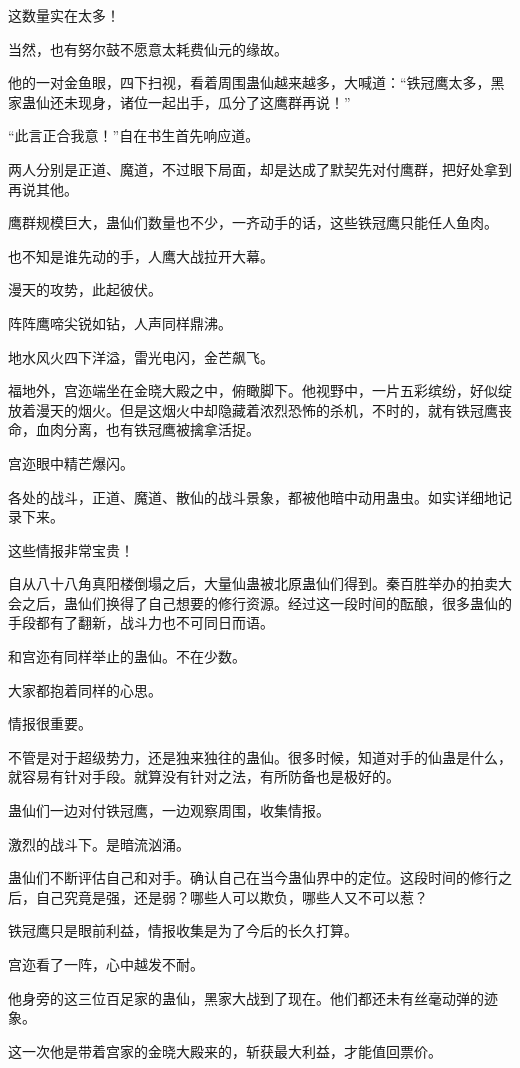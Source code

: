 \begin{this_body}
这数量实在太多！

当然，也有努尔鼓不愿意太耗费仙元的缘故。

他的一对金鱼眼，四下扫视，看着周围蛊仙越来越多，大喊道：“铁冠鹰太多，黑家蛊仙还未现身，诸位一起出手，瓜分了这鹰群再说！”

“此言正合我意！”自在书生首先响应道。

两人分别是正道、魔道，不过眼下局面，却是达成了默契先对付鹰群，把好处拿到再说其他。

鹰群规模巨大，蛊仙们数量也不少，一齐动手的话，这些铁冠鹰只能任人鱼肉。

也不知是谁先动的手，人鹰大战拉开大幕。

漫天的攻势，此起彼伏。

阵阵鹰啼尖锐如钻，人声同样鼎沸。

地水风火四下洋溢，雷光电闪，金芒飙飞。

福地外，宫迩端坐在金晓大殿之中，俯瞰脚下。他视野中，一片五彩缤纷，好似绽放着漫天的烟火。但是这烟火中却隐藏着浓烈恐怖的杀机，不时的，就有铁冠鹰丧命，血肉分离，也有铁冠鹰被擒拿活捉。

宫迩眼中精芒爆闪。

各处的战斗，正道、魔道、散仙的战斗景象，都被他暗中动用蛊虫。如实详细地记录下来。

这些情报非常宝贵！

自从八十八角真阳楼倒塌之后，大量仙蛊被北原蛊仙们得到。秦百胜举办的拍卖大会之后，蛊仙们换得了自己想要的修行资源。经过这一段时间的酝酿，很多蛊仙的手段都有了翻新，战斗力也不可同日而语。

和宫迩有同样举止的蛊仙。不在少数。

大家都抱着同样的心思。

情报很重要。

不管是对于超级势力，还是独来独往的蛊仙。很多时候，知道对手的仙蛊是什么，就容易有针对手段。就算没有针对之法，有所防备也是极好的。

蛊仙们一边对付铁冠鹰，一边观察周围，收集情报。

激烈的战斗下。是暗流汹涌。

蛊仙们不断评估自己和对手。确认自己在当今蛊仙界中的定位。这段时间的修行之后，自己究竟是强，还是弱？哪些人可以欺负，哪些人又不可以惹？

铁冠鹰只是眼前利益，情报收集是为了今后的长久打算。

宫迩看了一阵，心中越发不耐。

他身旁的这三位百足家的蛊仙，黑家大战到了现在。他们都还未有丝毫动弹的迹象。

这一次他是带着宫家的金晓大殿来的，斩获最大利益，才能值回票价。


\end{this_body}
